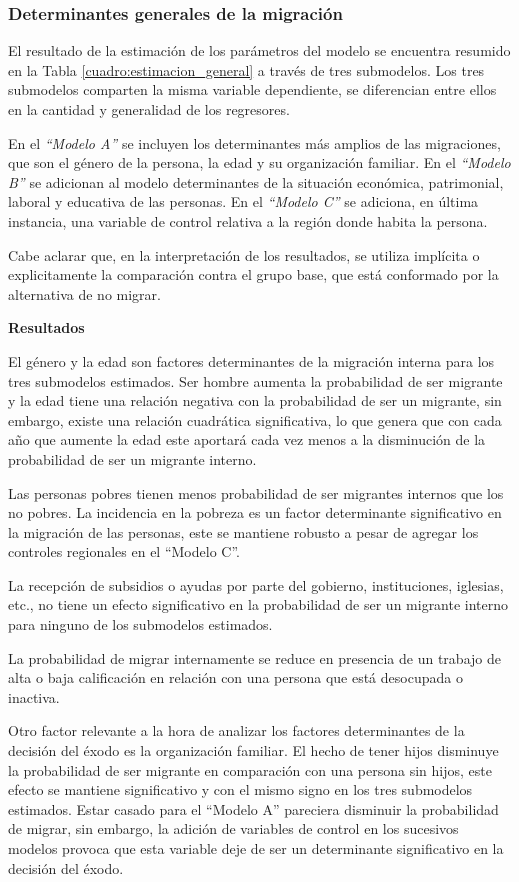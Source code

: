 \documentclass[12pt,a4paper]{article}
\begin{document}
\subsubsection{Determinantes generales de la migración}
El resultado de la estimación de los parámetros del modelo se encuentra resumido en la Tabla \ref{cuadro:estimacion_general} a través de tres submodelos.
Los tres submodelos comparten la misma variable dependiente, se diferencian entre ellos en la cantidad y generalidad de los regresores.

En el \textit{``Modelo A''} se incluyen los determinantes más amplios de las migraciones, que son el género de la persona, la edad y su organización familiar.
En el \textit{``Modelo B''} se adicionan al modelo determinantes de la situación económica, patrimonial, laboral y educativa de las personas.
En el \textit{``Modelo C''} se adiciona, en última instancia, una variable de control relativa a la región donde habita la persona.

Cabe aclarar que, en la interpretación de los resultados, se utiliza implícita o explicitamente la comparación contra el grupo base, que está conformado por la alternativa de no migrar.

\textbf{Resultados}

El género y la edad son factores determinantes de la migración interna para los tres submodelos estimados. Ser hombre aumenta la probabilidad de ser migrante y la edad tiene una relación negativa con la probabilidad de ser un migrante, sin embargo, existe una relación cuadrática significativa, lo que genera que con cada año que aumente la edad este aportará cada vez menos a la disminución de  la probabilidad de ser un migrante interno.

Las personas pobres tienen menos probabilidad de ser migrantes internos que los no pobres. La incidencia en la pobreza es un factor determinante significativo en la migración de las personas, este se mantiene robusto a pesar de agregar los controles regionales en el ``Modelo C''. 

La recepción de subsidios o ayudas por parte del gobierno, instituciones, iglesias, etc., no tiene un efecto significativo en la probabilidad de ser un migrante interno para ninguno de los submodelos estimados. 

La probabilidad de migrar internamente se reduce en presencia de un trabajo de alta o baja calificación en relación con una persona que está desocupada o inactiva.

Otro factor relevante a la hora de analizar los factores determinantes de la decisión del éxodo es la organización familiar. El hecho de tener hijos disminuye la probabilidad de ser migrante en comparación con una persona sin hijos, este efecto se mantiene significativo y con el mismo signo en los tres submodelos estimados. Estar casado para el ``Modelo A'' pareciera disminuir la probabilidad de migrar, sin embargo, la adición de variables de control en los sucesivos modelos provoca que esta variable deje de ser un determinante significativo en la decisión del éxodo.
\end{document}
